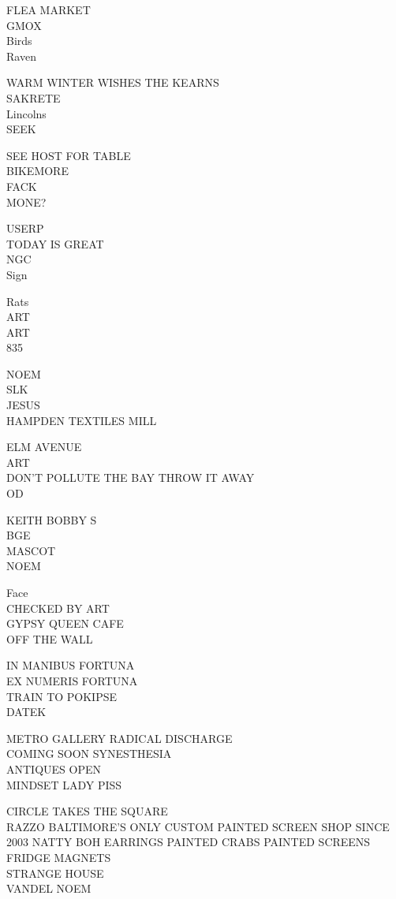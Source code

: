 \documentclass[10pt,letterpaper]{article}
\begin{document}
FLEA MARKET\\
GMOX\\
Birds\\
Raven

WARM WINTER WISHES THE KEARNS\\
SAKRETE\\
Lincolns\\
SEEK

SEE HOST FOR TABLE\\
BIKEMORE\\
FACK\\
MONE?

USERP\\
TODAY IS GREAT\\
NGC\\
Sign

Rats\\
ART\\
ART\\
835

NOEM\\
SLK\\
JESUS\\
HAMPDEN TEXTILES MILL

ELM AVENUE\\
ART\\
DON'T POLLUTE THE BAY THROW IT AWAY\\
OD

KEITH BOBBY S\\
BGE\\
MASCOT\\
NOEM

Face\\
CHECKED BY ART\\
GYPSY QUEEN CAFE\\
OFF THE WALL

IN MANIBUS FORTUNA\\
EX NUMERIS FORTUNA\\
TRAIN TO POKIPSE\\
DATEK

METRO GALLERY RADICAL DISCHARGE\\
COMING SOON SYNESTHESIA\\
ANTIQUES OPEN\\
MINDSET LADY PISS

CIRCLE TAKES THE SQUARE\\
RAZZO BALTIMORE'S ONLY CUSTOM PAINTED SCREEN SHOP SINCE 2003 NATTY BOH EARRINGS PAINTED CRABS PAINTED SCREENS FRIDGE MAGNETS\\
STRANGE HOUSE\\
VANDEL NOEM
\end{document}
